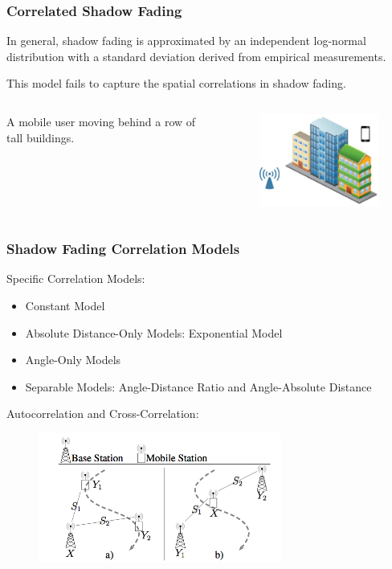 \documentclass{beamer}
\begin{document}
\begin{frame}
\frametitle{Correlated Shadow Fading}
\begin{block}{}
In general, shadow fading is approximated by an independent log-normal distribution with a standard deviation derived from empirical measurements.
\end{block}
\begin{block}{}
This model fails to capture the spatial correlations in shadow fading.
\end{block}
\begin{columns}[c]
A mobile user moving behind a row of tall buildings.
\begin{figure}
\includegraphics[width=5cm]{building.eps}
\end{figure}
\end{columns}
\end{frame}
%
%
\begin{frame}
\frametitle{Shadow Fading Correlation Models}
Specific Correlation Models:
\begin{itemize}
\item Constant Model
\item Absolute Distance-Only Models: Exponential Model
\item Angle-Only Models
\item Separable Models: Angle-Distance Ratio and Angle-Absolute Distance
\end{itemize}
Autocorrelation and Cross-Correlation:
\begin{figure}
\includegraphics[width=8cm]{AutoandCross.png}
\end{figure}
\end{frame}
%
\end{document}
